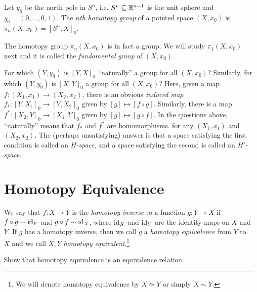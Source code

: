 \begin{definition}
  Let $y_0$ be the north pole in $S^n$, i.e.
  $S^n \subseteq \mathbb{R}^{n + 1}$ is the unit sphere and
  $y_0 = (0, \dots, 0, 1)$. The
  \emph{$n$th homotopy group}
  of a pointed space $(X, x_0)$ is
  $\pi_n(X, x_0) = [S^n, X]_0$.
\end{definition}

\begin{remark}
  The homotopy group $\pi_n(X, x_0)$ is in fact a
  group. We will study $\pi_1(X, x_0)$ next and it is
  called the \emph{fundamental group} of $(X, x_0)$.
\end{remark}

\begin{remark}
  For which $(Y, y_0)$ is $[Y, X]_0$ ``naturally'' a
  group for all $(X, x_0)$? Similarly, for which
  $(Y, y_0)$ is $[X, Y]_0$ a group for all $(X, x_0)$?
  Here, given a map $f : (X_1, x_1) \to (X_2, x_2)$,
  there is an obvious \emph{induced map}
  $f_* : [Y, X_1]_0 \to [Y, X_2]_0$ given by
  $[g] \mapsto [f \circ g]$. Similarly, there is a map
  $f^* : [X_2, Y]_0 \to [X_1, Y]_0$ given by
  $[g] \mapsto [g \circ f]$. In the questions above,
  ``naturally'' means that $f_*$ and $f^*$ are
  homomorphisms.
  for any $(X_1, x_1)$ and $(X_2, x_2)$.
  The (perhaps unsatisfying) answer is that
  a space satisfying the first condition is called
  an \emph{$H$-space}, and a space satisfying the second
  is called an \emph{$H'$-space}.
\end{remark}

\section{Homotopy Equivalence}
\begin{definition}
  We say that $f : X \to Y$ is the \emph{homotopy inverse}
  to a function $g : Y \to X$ if
  $f \circ g \sim \operatorname{id}_Y$ and $g \circ f \sim \operatorname{id}_X$,
  where $\operatorname{id}_X$ and $\operatorname{id}_Y$ are the identity maps
  on $X$ and $Y$.
  If $g$ has a homotopy inverse, then
  we call $g$ a \emph{homotopy equivalence} from $Y$ to
  $X$ and we call $X, Y$ \emph{homotopy equivalent}.\footnote{We will denote homotopy equivalence by $X \simeq Y$ or simply $X \sim Y$.}
\end{definition}

\begin{exercise}
  Show that homotopy equivalence is an equivalence
  relation.
\end{exercise}

